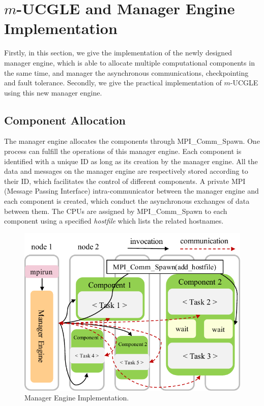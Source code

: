 \section{$m$-UCGLE and Manager Engine Implementation}\label{engineimpl}

Firstly, in this section, we give the implementation of the newly designed manager engine, which is able to allocate multiple computational components in the same time, and manager the asynchronous communications, checkpointing and fault tolerance. Secondly, we give the practical implementation of $m$-UCGLE using this new manager engine.

\subsection{Component Allocation}

The manager engine allocates the components through MPI\_Comm\_Spawn. One process can fulfill the operations of this manager engine. Each component is identified with a unique ID as long as its creation by the manager engine. All the data and messages on the manager engine are respectively stored according to their ID, which facilitates the control of different components. A private MPI (Message Passing Interface) intra-communicator between the manager engine and each component is created, which conduct the asynchronous exchanges of data between them. The CPUs are assigned by MPI\_Comm\_Spawn to each component using a specified \textit{hostfile} which lists the related hostnames.

\begin{figure}[t]
	\centering
	\includegraphics[width=.84\linewidth]{fig/xmp-yml-exec3.pdf}
	\caption{Manager Engine Implementation.}
	\label{fig:xmp-yml-exec}
\end{figure}

